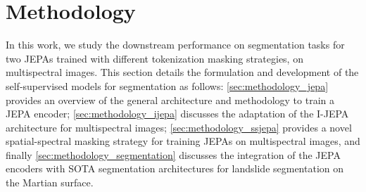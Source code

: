 \section{Methodology}
\label{sec:methodology}

In this work, we study the downstream performance on segmentation tasks for two JEPAs trained with different tokenization masking strategies, on multispectral images. This section details the formulation and development of the self-supervised models for segmentation as follows: \cref{sec:methodology_jepa} provides an overview of the general architecture and methodology to train a JEPA encoder; \cref{sec:methodology_ijepa} discusses the adaptation of the I-JEPA~\cite{assran2023selfsupervisedlearningimagesjointembedding} architecture for multispectral images; \cref{sec:methodology_ssjepa} provides a novel spatial-spectral masking strategy for training JEPAs on multispectral images, and finally \cref{sec:methodology_segmentation} discusses the integration of the JEPA encoders with SOTA segmentation architectures for landslide segmentation on the Martian surface.

%
%

